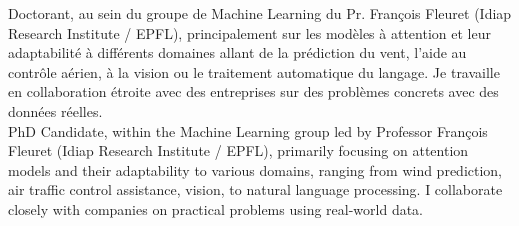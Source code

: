 \commonvspace
\color{deepgray}
\small
\ifFrench
  Doctorant, au sein du groupe de Machine Learning du Pr. François Fleuret (Idiap Research Institute / EPFL), principalement sur les modèles à attention et leur adaptabilité à différents domaines allant de la prédiction du vent, l'aide au contrôle aérien, à la vision ou le traitement automatique du langage. Je travaille en collaboration étroite avec des entreprises sur des problèmes concrets avec des données réelles. \\
\else
  PhD Candidate, within the Machine Learning group led by Professor François Fleuret (Idiap Research Institute / EPFL), primarily focusing on attention models and their adaptability to various domains, ranging from wind prediction, air traffic control assistance, vision, to natural language processing. I collaborate closely with companies on practical problems using real-world data.\\
\fi
\commonvspace
\color{deepgray}